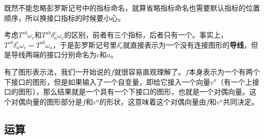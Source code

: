 既然不能忽略彭罗斯记号中的指标命名，就算省略指标命名也需要默认指标的位置顺序，所以换接口指标的时候要小心。

考虑$T^{ab}\omega_{c}$和$T^{ab}\delta^c_a\omega_{c}$的区别，前者有三个指标，后者只有一个。事实上，$T^{ab}\delta^c_a\omega_{c} = T^{ab}\omega_{a}$，于是彭罗斯记号里$\delta^c_a$就直接表示为一个没有连接图形的\textbf{导线}，但是导线两端的接口分别命名为$c$和$a$。


有了图形表示法，我们一开始说的$f$就很容易直观理解了。$f$本身表示为一个有两个下接口的图形，但是如果输入了一个自变量，即给它接入一个向量$v^a$（有一个上接口的图形），那么结果就是一个具有一个下接口的图形，也就是一个对偶向量。这个对偶向量的图形部分是$f$和$v^a$的形状，这意味着这个对偶向量由$f$和$v^a$共同决定。



\subsection{运算}




























